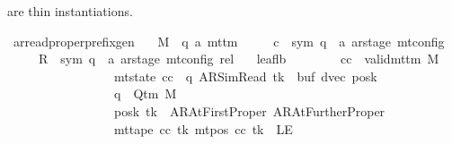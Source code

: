 \begin{isabellebody}
\begin{isamarkuptext}
  are thin instantiations.%
\end{isamarkuptext}\isamarkuptrue%
\isamarkupfalse%
\ ar{\isacharunderscore}{\kern0pt}read{\isacharunderscore}{\kern0pt}proper{\isacharunderscore}{\kern0pt}prefix{\isacharunderscore}{\kern0pt}gen{\isacharcolon}{\kern0pt}\isanewline
\ \ \ M\ {\isacharcolon}{\kern0pt}{\isacharcolon}{\kern0pt}\ {\isachardoublequoteopen}{\isacharparenleft}{\kern0pt}{\isacharprime}{\kern0pt}q{\isacharcomma}{\kern0pt}\ {\isacharprime}{\kern0pt}a{\isacharparenright}{\kern0pt}\ mttm{\isachardoublequoteclose}\isanewline
\ \ \ \ \ c{\isacharprime}{\kern0pt}\ {\isacharcolon}{\kern0pt}{\isacharcolon}{\kern0pt}\ {\isachardoublequoteopen}{\isacharparenleft}{\kern0pt}sym{}{\isacharcomma}{\kern0pt}\ {\isacharprime}{\kern0pt}q\ {\isasymtimes}\ {\isacharprime}{\kern0pt}a\ ar{\isacharunderscore}{\kern0pt}stage{\isacharparenright}{\kern0pt}\ mt{\isacharunderscore}{\kern0pt}config{\isachardoublequoteclose}\isanewline
\ \ \ \ \ R{\isacharprime}{\kern0pt}\ {\isacharcolon}{\kern0pt}{\isacharcolon}{\kern0pt}\ {\isachardoublequoteopen}{\isacharparenleft}{\kern0pt}sym{}{\isacharcomma}{\kern0pt}\ {\isacharprime}{\kern0pt}q\ {\isasymtimes}\ {\isacharprime}{\kern0pt}a\ ar{\isacharunderscore}{\kern0pt}stage{\isacharparenright}{\kern0pt}\ mt{\isacharunderscore}{\kern0pt}config\ rel{\isachardoublequoteclose}\isanewline
\ \ \ leaf{\isacharunderscore}{\kern0pt}lb{}{\isacharcolon}{\kern0pt}\isanewline
\ \ \ \ \ \ \ \ {\isachardoublequoteopen}{\isasymAnd}cc{\isachardot}{\kern0pt}\ {\isasymlbrakk}\ valid{\isacharunderscore}{\kern0pt}mttm\ M{\isacharsemicolon}{\kern0pt}\isanewline
\ \ \ \ \ \ \ \ \ \ \ \ \ \ \ \ \ mt{\isacharunderscore}{\kern0pt}state\ cc\ {\isacharequal}{\kern0pt}\ {\isacharparenleft}{\kern0pt}q{\isacharcomma}{\kern0pt}\ AR{\isacharunderscore}{\kern0pt}SimRead{\isacharcomma}{\kern0pt}\ tk{\isacharcomma}{\kern0pt}\ {}{\isacharcomma}{\kern0pt}\ buf{\isacharcomma}{\kern0pt}\ dvec{\isacharcomma}{\kern0pt}\ posk{\isacharparenright}{\kern0pt}{\isacharsemicolon}{\kern0pt}\isanewline
\ \ \ \ \ \ \ \ \ \ \ \ \ \ \ \ \ q\ {\isasymin}\ Q{\isacharunderscore}{\kern0pt}tm\ M{\isacharsemicolon}{\kern0pt}\isanewline
\ \ \ \ \ \ \ \ \ \ \ \ \ \ \ \ \ posk\ tk\ {\isasymin}\ {\isacharbraceleft}{\kern0pt}AR{\isacharunderscore}{\kern0pt}AtFirstProper{\isacharcomma}{\kern0pt}\ AR{\isacharunderscore}{\kern0pt}AtFurtherProper{\isacharbraceright}{\kern0pt}{\isacharsemicolon}{\kern0pt}\isanewline
\ \ \ \ \ \ \ \ \ \ \ \ \ \ \ \ \ mt{\isacharunderscore}{\kern0pt}tape\ cc\ tk\ {\isacharparenleft}{\kern0pt}mt{\isacharunderscore}{\kern0pt}pos\ cc\ tk{\isacharparenright}{\kern0pt}\ {\isasymnoteq}\ LE{}{\isacharsemicolon}{\kern0pt}\isanewline

\end{isabellebody}
